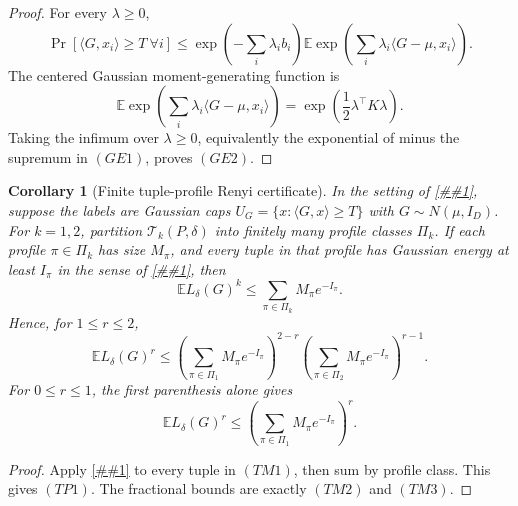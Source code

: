 \documentclass[10pt]{article}
\newcommand{\cref}[1]{\ref{##1}}
\newtheorem{corollary}[theorem]{Corollary}
\theoremstyle{definition}
\newcommand{\E}{\mathbb{E}}
\newcommand{\ip}[2]{\langle #1,#2\rangle}
\begin{document}
\begin{proof}
   For every \(\lambda\ge0\),
   \[
      \Pr[\ip{G}{x_i}\ge T\ \forall i]
      \le
      \exp\!\left(
         -\sum_i\lambda_i b_i
      \right)
      \E\exp\!\left(\sum_i\lambda_i\ip{G-\mu}{x_i}\right).
   \]
   The centered Gaussian moment-generating function is
   \[
      \E\exp\!\left(\sum_i\lambda_i\ip{G-\mu}{x_i}\right)
      =
      \exp\!\left(\frac12\lambda^\top K\lambda\right).
   \]
   Taking the infimum over \(\lambda\ge0\), equivalently the exponential of
   minus the supremum in \((GE1)\), proves \((GE2)\).
\end{proof}

\begin{corollary}[Finite tuple-profile Renyi certificate]
   \label{cor:tuple-profile-renyi-certificate}
   In the setting of \cref{lem:packing-list-tuple-moment}, suppose the labels
   are Gaussian caps \(U_G=\{x:\ip{G}{x}\ge T\}\) with
   \(G\sim N(\mu,I_D)\).  For \(k=1,2\), partition
   \(\mathcal T_k(P,\delta)\) into finitely many profile classes \(\Pi_k\).
   If each profile \(\pi\in\Pi_k\) has size \(M_\pi\), and every tuple in that
   profile has Gaussian energy at least \(I_\pi\) in the sense of
   \cref{lem:gaussian-cap-intersection-energy}, then
   \[
      \E L_\delta(G)^k
      \le
      \sum_{\pi\in\Pi_k}M_\pi e^{-I_\pi}.
      \tag{TP1}
   \]
   Hence, for \(1\le r\le2\),
   \[
      \E L_\delta(G)^r
      \le
      \left(\sum_{\pi\in\Pi_1}M_\pi e^{-I_\pi}\right)^{2-r}
      \left(\sum_{\pi\in\Pi_2}M_\pi e^{-I_\pi}\right)^{r-1}.
      \tag{TP2}
   \]
   For \(0\le r\le1\), the first parenthesis alone gives
   \[
      \E L_\delta(G)^r
      \le
      \left(\sum_{\pi\in\Pi_1}M_\pi e^{-I_\pi}\right)^r.
      \tag{TP3}
   \]
\end{corollary}

\begin{proof}
   Apply \cref{lem:gaussian-cap-intersection-energy} to every tuple in
   \((TM1)\), then sum by profile class.  This gives \((TP1)\).  The
   fractional bounds are exactly \((TM2)\) and \((TM3)\).
\end{proof}
\end{document}
